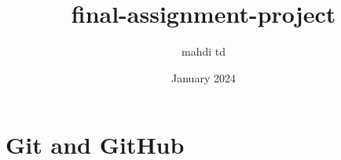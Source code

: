 \documentclass{article}
\title{final-assignment-project}
\author{mahdi td}
\date{January 2024}
\begin{document}
\maketitle
\newpage
\section{Git and GitHub}
\end{document}
